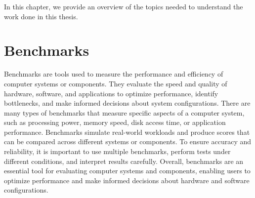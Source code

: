In this chapter, we provide an overview of the topics needed to understand the work done in this thesis.

\section{Benchmarks}
Benchmarks are tools used to measure the performance and efficiency of computer systems or components.
They evaluate the speed and quality of hardware, software, and applications to optimize performance, identify bottlenecks, and make informed decisions about system configurations.
There are many types of benchmarks that measure specific aspects of a computer system, such as processing power, memory speed, disk access time, or application performance.
Benchmarks simulate real-world workloads and produce scores that can be compared across different systems or components.
To ensure accuracy and reliability, it is important to use multiple benchmarks, perform tests under different conditions, and interpret results carefully.
Overall, benchmarks are an essential tool for evaluating computer systems and components, enabling users to optimize performance and make informed decisions about hardware and software configurations.\cite{Benchmarking_2022}


